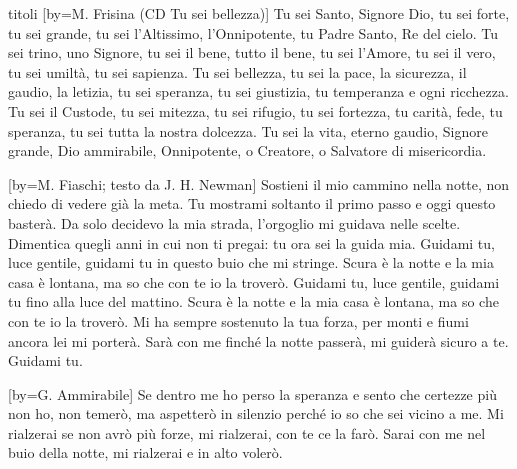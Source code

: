 \begin{songs}{titoli}
[by={M. Frisina (CD Tu sei bellezza)}]
\beginverse*
Tu sei Santo, Signore Dio,
tu sei forte, tu sei grande,
tu sei l'Altissimo, l'Onnipotente,
tu Padre Santo, Re del cielo.
\endverse
\beginverse*
Tu sei trino, uno Signore,
tu sei il bene, tutto il bene,
tu sei l'Amore, tu sei il vero,
tu sei umiltà, tu sei sapienza.
\endverse
\beginverse*
Tu sei bellezza, tu sei la pace,
la sicurezza, il gaudio, la letizia,
tu sei speranza, tu sei giustizia,
tu temperanza e ogni ricchezza.
\endverse
\beginverse*
Tu sei il Custode, tu sei mitezza,
tu sei rifugio, tu sei fortezza,
tu carità, fede, tu speranza,
tu sei tutta la nostra dolcezza.
\endverse
\beginverse*
Tu sei la vita, eterno gaudio,
Signore grande, Dio ammirabile,
Onnipotente, o Creatore,
o Salvatore di misericordia.
\endverse
\endsong

[by={M. Fiaschi; testo da J. H. Newman}]
\beginverse
Sostieni il mio cammino nella notte,
non chiedo di vedere già la meta.
Tu mostrami soltanto il primo passo
e oggi questo basterà.
Da solo decidevo la mia strada,
l'orgoglio mi guidava nelle scelte.
Dimentica quegli anni in cui non ti pregai:
tu ora sei la guida mia.
\endverse
\beginchorus
Guidami tu, luce gentile,
guidami tu in questo buio che mi stringe.
Scura è la notte e la mia casa è lontana,
ma so che con te io la troverò.
Guidami tu, luce gentile,
guidami tu fino alla luce del mattino.
Scura è la notte e la mia casa è lontana,
ma so che con te io la troverò.
\endchorus
\beginverse
Mi ha sempre sostenuto la tua forza,
per monti e fiumi ancora lei mi porterà.
Sarà con me finché la notte passerà,
mi guiderà sicuro a te.
\endverse
\beginverse*
Guidami tu.
\endverse
\endsong

[by={G. Ammirabile}]
\beginverse*
Se dentro me ho perso la speranza
e sento che certezze più non ho,
non temerò, ma aspetterò in silenzio
perché io so che sei vicino a me.
\endverse
\beginchorus
Mi rialzerai se non avrò più forze,
mi rialzerai, con te ce la farò.
Sarai con me nel buio della notte,
mi rialzerai e in alto volerò.
\endchorus
\endsong


\end{songs}
